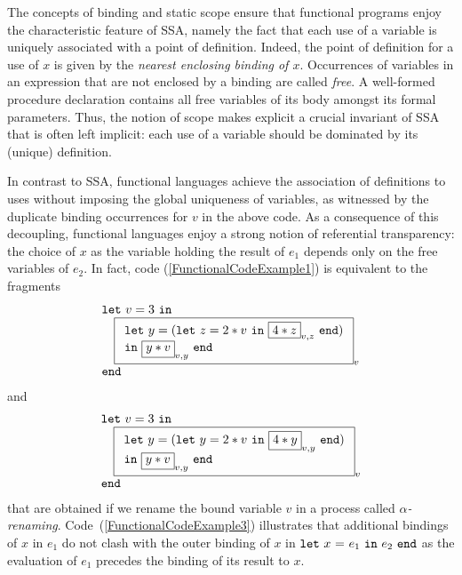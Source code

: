 The concepts of binding and static scope ensure that functional
programs enjoy the characteristic feature of SSA, namely the fact that
each use of a variable is uniquely associated with a point of
definition. Indeed, the point of definition for a use of $x$ is given
by the \emph{nearest enclosing binding of $x$}. Occurrences of
variables in an expression that are not enclosed by a binding are
called \emph{free}. A well-formed procedure declaration contains all
free variables of its body amongst its formal parameters.  Thus, the
notion of scope makes explicit a crucial invariant of SSA that is
often left implicit: each use of a variable should be dominated by its
(unique) definition.

In contrast to SSA, functional languages achieve the association of
definitions to uses without imposing the global uniqueness of
variables, as witnessed by the duplicate binding occurrences for $v$
in the above code. As a consequence of this decoupling, functional
languages enjoy a strong notion of referential transparency: the
choice of $x$ as the variable holding the result of $e_1$ depends only
on the free variables of $e_2$. In fact, code
(\ref{FunctionalCodeExample1}) is equivalent to the fragments
\begin{equation}
\label{FunctionalCodeExample2}
\begin{array}{l}
\mathtt{let}\ v = 3\ \mathtt{in}\\
\quad 
  \fbox{$
   \begin{array}[t]{l} 
    \mathtt{let}\ y = (\mathtt{let}\ z=2*v \ \mathtt{in}\ \fbox{$4*z$}_{v,z}\ \mathtt{end})\\
    \mathtt{in}\ \fbox{$y*v$}_{v,y}\ \mathtt{end}\\
\end{array}$}_v\\
\mathtt{end}
\end{array}
\end{equation}
and
\begin{equation}
\label{FunctionalCodeExample3}
\begin{array}{l}
\mathtt{let}\ v = 3\ \mathtt{in}\\
\quad 
  \fbox{$
   \begin{array}[t]{l} 
    \mathtt{let}\ y = (\mathtt{let}\ y=2*v \ \mathtt{in}\ \fbox{$4*y$}_{v,y}\ \mathtt{end})\\
    \mathtt{in}\ \fbox{$y*v$}_{v,y}\ \mathtt{end}\\
\end{array}$}_v\\
\mathtt{end}
\end{array}
\end{equation} 
that are obtained if we rename the bound variable $v$ in a process
called \emph{$\alpha$-renaming}. Code~(\ref{FunctionalCodeExample3})
illustrates that additional bindings of $x$ in $e_1$ do not clash with
the outer binding of $x$ in $\mathtt{let}\ {x}\ \mathtt{=}\ {e_1}\ \mathtt{in}\ {e_2}\ \mathtt{end}$ as the evaluation
of $e_1$ precedes the binding of its result to $x$.


